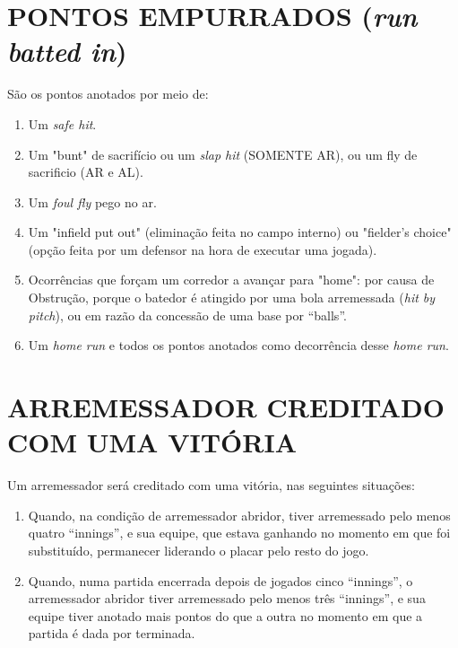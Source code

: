 \section{PONTOS EMPURRADOS (\textit{run batted in}) }
\begin{multicols}{2} 
	São os pontos anotados por meio de: 
	
	\begin{enumerate}[label=\alph*)]
		\item Um \textit{safe hit}. 
		
		\item  Um "bunt" de sacrifício ou um \textit{slap hit} (SOMENTE AR), ou um \gls{fly de sacrificio} (AR e AL). 
		
		\item  Um \textit{foul fly} pego no ar.
		\item Um "infield put out" (eliminação feita no campo interno) ou "fielder's choice" 
		(opção feita por um defensor na hora de executar uma jogada). 
		
		\item  Ocorrências que forçam um corredor a avançar para "home": por causa de 
		Obstrução, porque o batedor é atingido por uma bola arremessada (\textit{hit by pitch}), ou 
		em razão da concessão de uma base por “balls”. 
		
		\item  Um \textit{home run} e todos os pontos anotados como decorrência desse \textit{home run}. 
	\end{enumerate}
\end{multicols}
\section{ARREMESSADOR CREDITADO COM UMA VITÓRIA }
\begin{multicols}{2} 
	Um arremessador será creditado com uma vitória, nas seguintes situações: 
	
	\begin{enumerate}[label=\alph*)]
		\item Quando, na condição de arremessador abridor, tiver arremessado pelo menos 
		quatro “innings”, e sua equipe, que estava ganhando no momento em que foi 
		substituído, permanecer liderando o placar pelo resto do jogo. 
		
		\item  Quando, numa partida encerrada depois de jogados cinco “innings”, o arremessador 
		abridor tiver arremessado pelo menos três “innings”, e sua equipe tiver anotado mais 
		pontos do que a outra no momento em que a partida é dada por terminada. 
	\end{enumerate}
\end{multicols}
